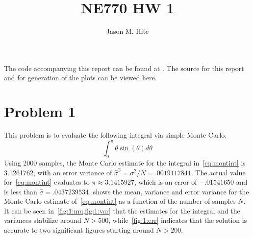 \documentclass[12pt]{article}
\title{\sc NE770 HW 1}
\author{Jason M. Hite}
\date{}
\begin{document}
\maketitle

The code accompanying this report can be found at . The source for this report and for generation of the
plots can be viewed here.

\section*{Problem 1}

This problem is to evaluate the following integral via simple Monte Carlo.
\begin{equation}
    \int_0^\pi \theta\sin(\theta)d\theta
    \label{eq:montint}
\end{equation}
Using 2000 samples, the Monte Carlo estimate for the integral in~\cref{eq:montint} is 3.1261762, with an
error variance of $\hat\sigma^2=\sigma^2/N=.0019117841$. The actual value for~\cref{eq:montint} evaluates to $\pi\approx
3.1415927$, which is an error of $-.01541650$ and is less than $\hat\sigma = .0437239534$.  shows the mean,
variance and error variance for the Monte Carlo estimate of~\cref{eq:montint} as a function of the number of samples $N$.
It can be seen in~\cref{fig:1:mu,fig:1:var} that the estimates for the integral and the variances stabilize around $N>500$,
while~\cref{fig:1:err} indicates that the solution is accurate to two significant figures starting around $N>200$.
\end{document}
